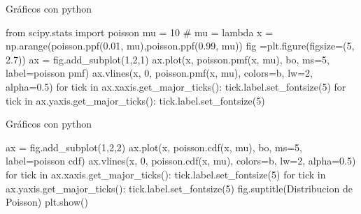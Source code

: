 \documentclass[
  ignorenonframetext,
  aspectratio=169]{beamer}
\newenvironment{Shaded}{\begin{snugshade}}{\end{snugshade}}
\newcommand{\CommentTok}[1]{\textcolor[rgb]{0.37,0.37,0.37}{#1}}
\newcommand{\ControlFlowTok}[1]{\textcolor[rgb]{0.00,0.23,0.31}{#1}}
\newcommand{\DecValTok}[1]{\textcolor[rgb]{0.68,0.00,0.00}{#1}}
\newcommand{\FloatTok}[1]{\textcolor[rgb]{0.68,0.00,0.00}{#1}}
\newcommand{\ImportTok}[1]{\textcolor[rgb]{0.00,0.46,0.62}{#1}}
\newcommand{\KeywordTok}[1]{\textcolor[rgb]{0.00,0.23,0.31}{#1}}
\newcommand{\NormalTok}[1]{\textcolor[rgb]{0.00,0.23,0.31}{#1}}
\newcommand{\OperatorTok}[1]{\textcolor[rgb]{0.37,0.37,0.37}{#1}}
\newcommand{\StringTok}[1]{\textcolor[rgb]{0.13,0.47,0.30}{#1}}
\begin{document}
\begin{frame}[fragile]{Gráficos con python}
\protect\hypertarget{gruxe1ficos-con-python-2}{}
\begin{Shaded}
\begin{Highlighting}[]
\ImportTok{from}\NormalTok{ scipy.stats }\ImportTok{import}\NormalTok{ poisson}
\NormalTok{mu }\OperatorTok{=} \DecValTok{10} \CommentTok{\# mu = lambda}
\NormalTok{x }\OperatorTok{=}\NormalTok{ np.arange(poisson.ppf(}\FloatTok{0.01}\NormalTok{, mu),poisson.ppf(}\FloatTok{0.99}\NormalTok{, mu))}
\NormalTok{fig }\OperatorTok{=}\NormalTok{plt.figure(figsize}\OperatorTok{=}\NormalTok{(}\DecValTok{5}\NormalTok{, }\FloatTok{2.7}\NormalTok{))}
\NormalTok{ax }\OperatorTok{=}\NormalTok{ fig.add\_subplot(}\DecValTok{1}\NormalTok{,}\DecValTok{2}\NormalTok{,}\DecValTok{1}\NormalTok{)}
\NormalTok{ax.plot(x, poisson.pmf(x, mu), }\StringTok{\textquotesingle{}bo\textquotesingle{}}\NormalTok{, ms}\OperatorTok{=}\DecValTok{5}\NormalTok{, label}\OperatorTok{=}\StringTok{\textquotesingle{}poisson pmf\textquotesingle{}}\NormalTok{)}
\NormalTok{ax.vlines(x, }\DecValTok{0}\NormalTok{, poisson.pmf(x, mu), colors}\OperatorTok{=}\StringTok{\textquotesingle{}b\textquotesingle{}}\NormalTok{, lw}\OperatorTok{=}\DecValTok{2}\NormalTok{, alpha}\OperatorTok{=}\FloatTok{0.5}\NormalTok{)}
\ControlFlowTok{for}\NormalTok{ tick }\KeywordTok{in}\NormalTok{ ax.xaxis.get\_major\_ticks():}
\NormalTok{  tick.label.set\_fontsize(}\DecValTok{5}\NormalTok{)}
\ControlFlowTok{for}\NormalTok{ tick }\KeywordTok{in}\NormalTok{ ax.yaxis.get\_major\_ticks(): }
\NormalTok{  tick.label.set\_fontsize(}\DecValTok{5}\NormalTok{) }
\end{Highlighting}
\end{Shaded}
\end{frame}

\begin{frame}[fragile]{Gráficos con python}
\protect\hypertarget{gruxe1ficos-con-python-3}{}
\begin{Shaded}
\begin{Highlighting}[]
\NormalTok{ax }\OperatorTok{=}\NormalTok{ fig.add\_subplot(}\DecValTok{1}\NormalTok{,}\DecValTok{2}\NormalTok{,}\DecValTok{2}\NormalTok{)}
\NormalTok{ax.plot(x, poisson.cdf(x, mu), }\StringTok{\textquotesingle{}bo\textquotesingle{}}\NormalTok{, ms}\OperatorTok{=}\DecValTok{5}\NormalTok{, label}\OperatorTok{=}\StringTok{\textquotesingle{}poisson cdf\textquotesingle{}}\NormalTok{)}
\NormalTok{ax.vlines(x, }\DecValTok{0}\NormalTok{, poisson.cdf(x, mu), colors}\OperatorTok{=}\StringTok{\textquotesingle{}b\textquotesingle{}}\NormalTok{, lw}\OperatorTok{=}\DecValTok{2}\NormalTok{, alpha}\OperatorTok{=}\FloatTok{0.5}\NormalTok{)}
\ControlFlowTok{for}\NormalTok{ tick }\KeywordTok{in}\NormalTok{ ax.xaxis.get\_major\_ticks():}
\NormalTok{  tick.label.set\_fontsize(}\DecValTok{5}\NormalTok{)}
\ControlFlowTok{for}\NormalTok{ tick }\KeywordTok{in}\NormalTok{ ax.yaxis.get\_major\_ticks():}
\NormalTok{  tick.label.set\_fontsize(}\DecValTok{5}\NormalTok{)}
\NormalTok{fig.suptitle(}\StringTok{\textquotesingle{}Distribucion de Poisson\textquotesingle{}}\NormalTok{)}
\NormalTok{plt.show()}
\end{Highlighting}
\end{Shaded}
\end{frame}
\end{document}
